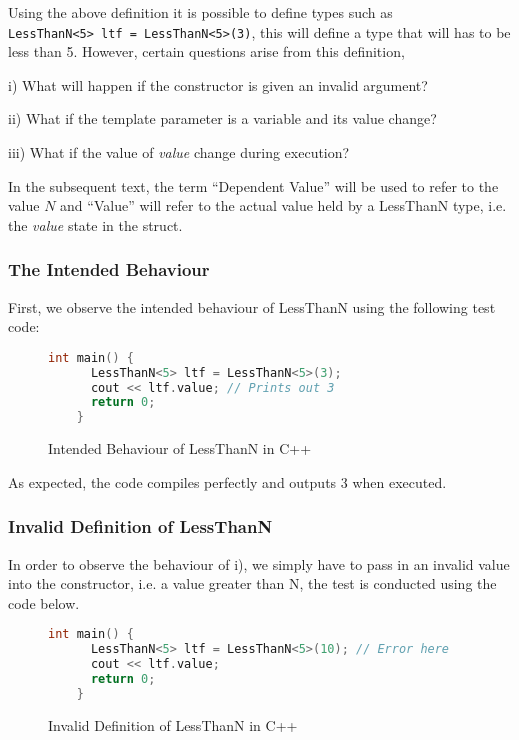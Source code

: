 \documentclass[a4paper,12pt]{report}
\begin{document}
\par
Using the above definition it is possible to define types such as \\
\verb+LessThanN<5> ltf = LessThanN<5>(3)+, this will define a type that will has 
to be less than 5. However, certain questions arise from this definition, 

i) What will happen if the constructor is given an invalid argument? 

ii) What if the template parameter is a variable and its 
value change? 

iii) What if the value of \textit{value} change during execution?

In the subsequent text, the term ``Dependent Value'' will be used to refer to the 
value $N$ and ``Value'' will refer to the actual value held by a LessThanN type, 
i.e. the \textit{value} state in the struct. 

\subsubsection{The Intended Behaviour}
First, we observe the intended behaviour of LessThanN using the following test 
code:
\begin{figure}[H]
  \begin{lstlisting}[language=c++]     
    int main() {
      LessThanN<5> ltf = LessThanN<5>(3);
      cout << ltf.value; // Prints out 3
      return 0;
    }
  \end{lstlisting}
  \caption{Intended Behaviour of LessThanN in C++}
\end{figure}

\par
As expected, the code compiles perfectly and outputs 3 when executed.

\subsubsection{Invalid Definition of LessThanN}
In order to observe the behaviour of i), we simply have to pass in an 
invalid value into the constructor, i.e. a value greater than N, 
the test is conducted using the code below. 

\begin{figure}[H]
  \begin{lstlisting}[language=c++]     
    int main() {
      LessThanN<5> ltf = LessThanN<5>(10); // Error here
      cout << ltf.value; 
      return 0;
    }
  \end{lstlisting}
  \caption{Invalid Definition of LessThanN in C++}
\end{figure}
\end{document}
